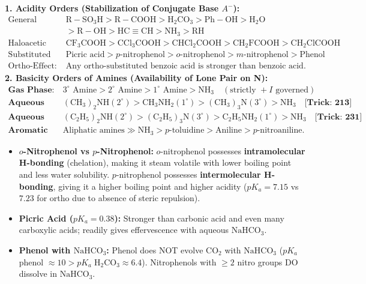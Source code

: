 \documentclass[10pt,a4paper]{article}
\begin{document}
\begin{formulabox}
\textbf{1. Acidity Orders (Stabilization of Conjugate Base $A^-$):}
\begin{align*}
  \text{General Class:} \quad & \mathrm{R-SO_3H} > \mathrm{R-COOH} > \mathrm{H_2CO_3} > \mathrm{Ph-OH} > \mathrm{H_2O}\\
  & > \mathrm{R-OH} > \mathrm{HC\equiv CH} > \mathrm{NH_3} > \mathrm{RH}\\
  \text{Haloacetic Acids:} \quad & \mathrm{CF_3COOH} > \mathrm{CCl_3COOH} > \mathrm{CHCl_2COOH} > \mathrm{CH_2FCOOH} > \mathrm{CH_2ClCOOH}\\
  \text{Substituted Phenols:} \quad & \text{Picric acid} > p\text{-nitrophenol} > o\text{-nitrophenol} > m\text{-nitrophenol} > \text{Phenol}\\
  \text{Ortho-Effect:} \quad & \text{Any ortho-substituted benzoic acid is stronger than benzoic acid.}
\end{align*}
\textbf{2. Basicity Orders of Amines (Availability of Lone Pair on N):}
\begin{align*}
  \textbf{Gas Phase:} \quad & 3^\circ \text{ Amine} > 2^\circ \text{ Amine} > 1^\circ \text{ Amine} > \mathrm{NH}_3 \quad (\text{strictly } +I \text{ governed})\\
  \textbf{Aqueous (Methyl):} \quad & (\mathrm{CH_3})_2\mathrm{NH} (2^\circ) > \mathrm{CH_3NH_2} (1^\circ) > (\mathrm{CH_3})_3\mathrm{N} (3^\circ) > \mathrm{NH}_3 \quad \textbf{[Trick: 213]}\\
  \textbf{Aqueous (Ethyl):} \quad & (\mathrm{C_2H_5})_2\mathrm{NH} (2^\circ) > (\mathrm{C_2H_5})_3\mathrm{N} (3^\circ) > \mathrm{C_2H_5NH_2} (1^\circ) > \mathrm{NH}_3 \quad \textbf{[Trick: 231]}\\
  \textbf{Aromatic Amines:} \quad & \text{Aliphatic amines} \gg \mathrm{NH}_3 > p\text{-toluidine} > \text{Aniline} > p\text{-nitroaniline}.
\end{align*}
\end{formulabox}

\begin{trapbox}
\begin{itemize}
  \item \textbf{$o$-Nitrophenol vs $p$-Nitrophenol:} $o$-nitrophenol possesses \textbf{intramolecular H-bonding} (chelation), making it steam volatile with lower boiling point and less water solubility. $p$-nitrophenol possesses \textbf{intermolecular H-bonding}, giving it a higher boiling point and higher acidity ($pK_a = 7.15$ vs $7.23$ for ortho due to absence of steric repulsion).
  \item \textbf{Picric Acid ($pK_a = 0.38$):} Stronger than carbonic acid and even many carboxylic acids; readily gives effervescence with aqueous $\mathrm{NaHCO}_3$.
  \item \textbf{Phenol with $\mathrm{NaHCO}_3$:} Phenol does NOT evolve $\mathrm{CO}_2$ with $\mathrm{NaHCO}_3$ ($pK_a$ phenol $\approx 10 > pK_a\; \mathrm{H_2CO_3} \approx 6.4$). Nitrophenols with $\ge 2$ nitro groups DO dissolve in $\mathrm{NaHCO}_3$.
\end{itemize}
\end{trapbox}
\end{document}
